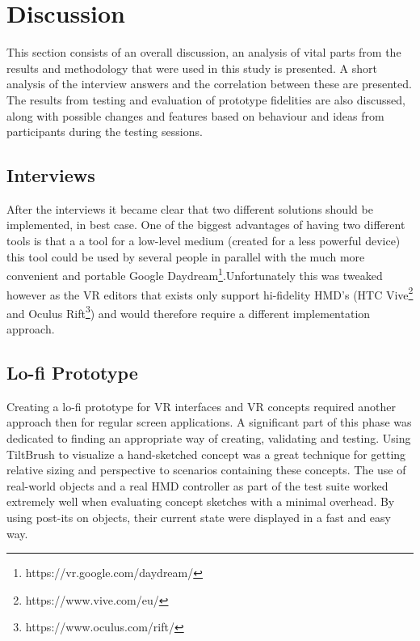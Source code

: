 
\chapter{Discussion}
\label{discussion}
This section consists of an overall discussion, an analysis of vital parts from the results and methodology that were used in this study is presented. A short analysis of the interview answers and the correlation between these are presented. The results from testing and evaluation of prototype fidelities are also discussed, along with possible changes and features based on behaviour and ideas from participants during the testing sessions.


\section{Interviews}
After the interviews it became clear that two different solutions should be implemented, in best case. One of the biggest advantages of having two different tools is that a a tool for a low-level medium (created for a less powerful device) this tool could be used by several people in parallel with the much more convenient and portable Google Daydream\footnote{https://vr.google.com/daydream/}.Unfortunately this was tweaked however as the VR editors that exists only support hi-fidelity HMD's (HTC Vive\footnote{https://www.vive.com/eu/} and Oculus Rift\footnote{https://www.oculus.com/rift/}) and would therefore require a different implementation approach.

\section{Lo-fi Prototype}
Creating a lo-fi prototype for VR interfaces and VR concepts required another approach then for regular screen applications. A significant part of this phase was dedicated to finding an appropriate way of creating, validating and testing. Using TiltBrush to visualize a hand-sketched concept was a great technique for getting relative sizing and perspective to scenarios containing these concepts. The use of real-world objects and a real HMD controller as part of the test suite worked extremely well when evaluating concept sketches with a minimal overhead. By using post-its on objects, their current state were displayed in a fast and easy way.

